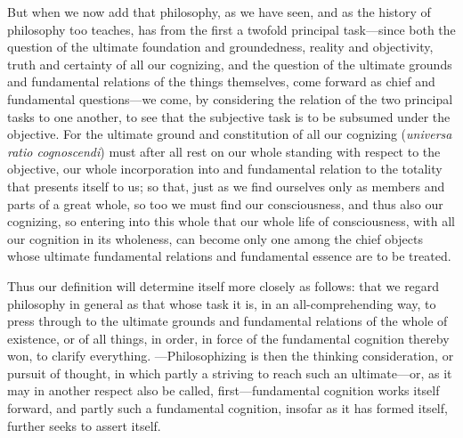 \documentclass[12pt,a4paper]{book}
\begin{document}
But when we now add that philosophy, as we have seen, and as the history of
philosophy too teaches, has from the first a twofold principal task---since both
the question of the ultimate foundation and groundedness, reality and objectivity,
truth and certainty of all our cognizing, and the question of the ultimate grounds
and fundamental relations of the things themselves, come forward as chief and
fundamental questions---we come, by considering the relation of the two principal
tasks to one another, to see that the subjective task is to be subsumed under the
objective. For the ultimate ground and constitution of all our cognizing
(\textit{universa ratio cognoscendi}) must after all rest on our whole standing
with respect to the objective, our whole incorporation into and fundamental
relation to the totality that presents itself to us; so that, just as we find
ourselves only as members and parts of a great whole, so too we must find our
consciousness, and thus also our cognizing, so entering into this whole that our
whole life of consciousness, with all our cognition in its wholeness, can become
only one among the chief objects whose ultimate fundamental relations and
fundamental essence are to be treated.

Thus our definition will determine itself more closely as follows: that we regard
philosophy in general as that whose task it is, in an all-comprehending way, to
press through to the ultimate grounds and fundamental relations of the whole of
existence, or of all things, in order, in force of the fundamental cognition
thereby won, to clarify everything. ---Philosophizing is then the thinking
consideration, or pursuit of thought, in which partly a striving to reach such an
ultimate---or, as it may in another respect also be called, first---fundamental
cognition works itself forward, and partly such a fundamental cognition, insofar as
it has formed itself, further seeks to assert itself.
\end{document}
